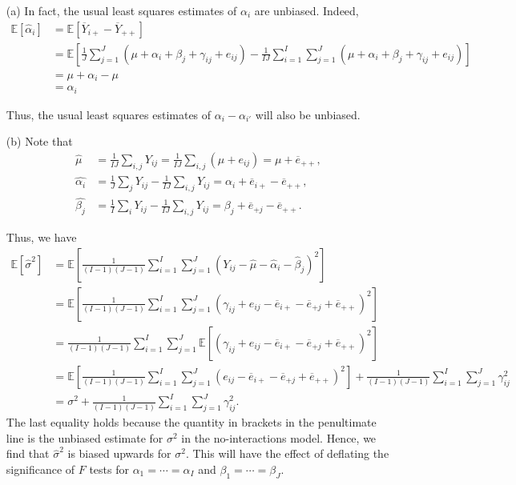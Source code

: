 \begin{itemize}
\item[(a)] In fact, the usual least squares estimates of $\alpha_i$ are unbiased. Indeed,
		\begin{equation}
		\begin{split}
		\mathbb E[\hat \alpha_i] &= \mathbb E[\overline Y_{i+} - \overline Y_{+ +}] \\
		&= \mathbb E\left[\frac{1}{J}\sum_{j = 1}^J (\mu + \alpha_i + \beta_j + \gamma_{ij} + e_{ij}) - \frac{1}{IJ}\sum_{i = 1}^I \sum_{j = 1}^{J}(\mu + \alpha_i + \beta_j + \gamma_{ij} + e_{ij}) \right] \\
		&= \mu + \alpha_i - \mu \\
		&= \alpha_i
		\end{split}
		\end{equation}

Thus, the usual least squares estimates of $\alpha_i - \alpha_{i'}$ will also be unbiased.

\item[(b)] Note that 
\begin{align*}
\hat{\mu} &= \frac{1}{IJ} \sum_{i,j} Y_{ij} = \frac{1}{IJ}\sum_{i,j} (\mu +  e_{ij}) = \mu + \overline e_{+ +}, \\ 
\hat{\alpha_i} &= \frac{1}{J} \sum_j Y_{ij} - \frac{1}{IJ} \sum_{i,j} Y_{ij} = \alpha_i + \overline e_{i +} - \overline e_{+ +}, \\
\hat{\beta_j} &= \frac{1}{I} \sum_i Y_{ij} - \frac{1}{IJ} \sum_{i,j} Y_{ij} = \beta_j + \overline e_{+ j} - \overline e_{+ +}.
\end{align*}

Thus, we have
		\begin{equation*}
		\begin{split}
		\mathbb E[\hat \sigma^2] &= \mathbb E\left[\frac{1}{(I-1)(J-1)}\sum_{i = 1}^I \sum_{j = 1}^J (Y_{ij} - \hat \mu - \hat \alpha_i - \hat \beta_j)^2\right] \\
		&= \mathbb E\left[\frac{1}{(I-1)(J-1)}\sum_{i = 1}^I \sum_{j = 1}^J (\gamma_{ij} + e_{ij} - \overline e_{i+} - \overline e_{+ j} + \overline e_{+ +})^2\right] \\
		&= \frac{1}{(I-1)(J-1)}\sum_{i = 1}^I \sum_{j = 1}^J \mathbb E\left[(\gamma_{ij} + e_{ij} - \overline e_{i+} - \overline e_{+ j} + \overline e_{+ +})^2\right] \\
		&= \mathbb E\left[\frac{1}{(I-1)(J-1)}\sum_{i = 1}^I \sum_{j = 1}^J (e_{ij} - \overline e_{i+} - \overline e_{+ j} + \overline e_{+ +})^2\right] + \frac{1}{(I-1)(J-1)}\sum_{i = 1}^I \sum_{j = 1}^J \gamma_{ij}^2 \\
		&= \sigma^2 + \frac{1}{(I-1)(J-1)}\sum_{i = 1}^I \sum_{j = 1}^J \gamma_{ij}^2.
		\end{split}
		\end{equation*}
		The last equality holds because the quantity in brackets in the penultimate line is the unbiased estimate for $\sigma^2$ in the no-interactions model. Hence, we find that $\hat \sigma^2$ is biased upwards for $\sigma^2$. This will have the effect of deflating the significance of $F$ tests for $\alpha_1 = \cdots = \alpha_I$ and $\beta_1= \cdots = \beta_J$. 
		

\end{itemize}
